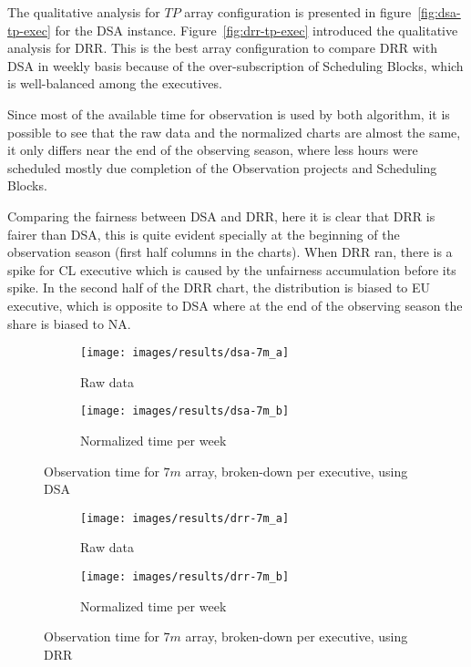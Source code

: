 The qualitative analysis for $TP$ array configuration is presented in figure~\ref{fig:dsa-tp-exec} for the DSA instance. Figure~\ref{fig:drr-tp-exec} introduced the qualitative analysis for DRR. This is the best array configuration to compare DRR with DSA in weekly basis because of the over-subscription of Scheduling Blocks, which is well-balanced among the executives.

Since most of the available time for observation is used by both algorithm, it is possible to see that the raw data and the normalized charts are almost the same, it only differs near the end of the observing season, where less hours were scheduled mostly due completion of the Observation projects and Scheduling Blocks.

Comparing the fairness between DSA and DRR, here it is clear that DRR is fairer than DSA, this is quite evident specially at the beginning of the observation season (first half columns in the charts). When DRR ran, there is a spike for CL executive which is caused by the unfairness accumulation before its spike. In the second half of the DRR chart, the distribution is biased to EU executive, which is opposite to DSA where at the end of the observing season the share is biased to NA.

\begin{figure}[t]
\centering
	\begin{subfigure}[b]{0.49\textwidth}
		\texttt{[image: images/results/dsa-7m\_a]}
        \caption{Raw data} 
    \end{subfigure} 
    \begin{subfigure}[b]{0.49\textwidth}
    		\texttt{[image: images/results/dsa-7m\_b]}
            \caption{Normalized time per week} 
    \end{subfigure}
    \caption{Observation time for $7m$ array, broken-down per executive, using DSA}
    \label{fig:dsa-7m-exec}
\end{figure}

\begin{figure}[t]
\centering
	\begin{subfigure}[b]{0.49\textwidth}
		\texttt{[image: images/results/drr-7m\_a]}
        \caption{Raw data} 
    \end{subfigure} 
    \begin{subfigure}[b]{0.49\textwidth}
    		\texttt{[image: images/results/drr-7m\_b]}
            \caption{Normalized time per week} 
    \end{subfigure}
    \caption{Observation time for $7m$ array, broken-down per executive, using DRR}
    \label{fig:drr-7m-exec}
\end{figure}

